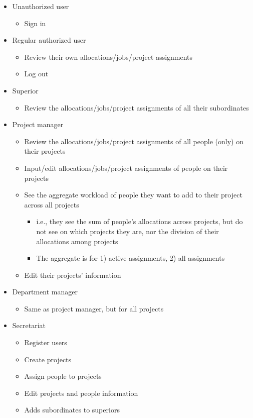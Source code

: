 \documentclass[czech,P5]{thesiskiv}
\begin{document}
\begin{itemize}
             \item Unauthorized user 
             \begin{itemize}
             	\item Sign in 
             \end{itemize}
             \item  Regular authorized user
               \begin{itemize}
             	\item Review their own allocations/jobs/project assignments 
             	\item Log out 
             \end{itemize}
             \item Superior
             \begin{itemize}
             	\item Review the allocations/jobs/project assignments of all their subordinates 
             \end{itemize}
             \item Project manager 
               \begin{itemize}
             	\item Review the allocations/jobs/project assignments of all people (only) on their projects 
             	\item Input/edit allocations/jobs/project assignments of people on their projects 
             	\item See the aggregate workload of people they want to add to their project across all projects 
	             	\begin{itemize}
	             		\item  i.e., they see the sum of people’s allocations across projects, but do not see on which projects they are, nor the division of their allocations among projects 
	             		\item The aggregate is for 1) active assignments, 2) all assignments 
	             	\end{itemize}
             	\item Edit their projects’ information 
             \end{itemize}
             \item Department manager 
              \begin{itemize}
             	\item Same as project manager, but for all projects 
             \end{itemize}
              \item Secretariat
               \begin{itemize}
             	\item Register users 
             	\item Create projects 
             	\item Assign people to projects 
             	\item Edit projects and people information
             	\item Adds subordinates to superiors 
             \end{itemize}
\end{itemize}
\end{document}
